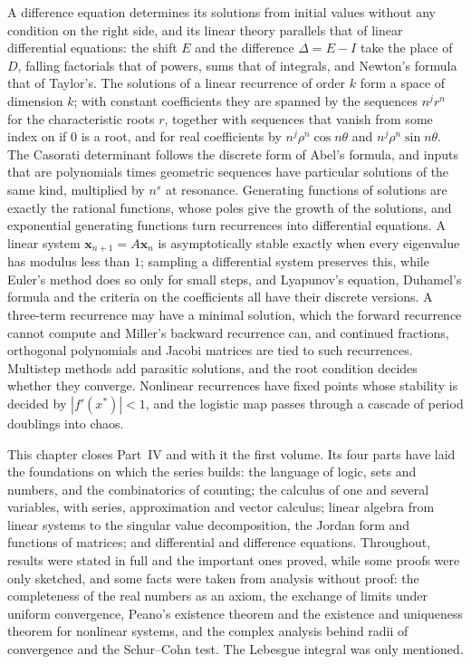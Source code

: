 \bigskip
A difference equation determines its solutions from initial values without any condition on the right side, and its linear theory parallels that of linear differential equations: the shift $E$ and the difference $\Delta=E-I$ take the place of $D$, falling factorials that of powers, sums that of integrals, and Newton's formula that of Taylor's. The solutions of a linear recurrence of order $k$ form a space of dimension $k$; with constant coefficients they are spanned by the sequences $n^jr^n$ for the characteristic roots $r$, together with sequences that vanish from some index on if $0$ is a root, and for real coefficients by $n^j\rho^n\cos n\theta$ and $n^j\rho^n\sin n\theta$. The Casorati determinant follows the discrete form of Abel's formula, and inputs that are polynomials times geometric sequences have particular solutions of the same kind, multiplied by $n^s$ at resonance. Generating functions of solutions are exactly the rational functions, whose poles give the growth of the solutions, and exponential generating functions turn recurrences into differential equations. A linear system $\mathbf x_{n+1}=A\mathbf x_n$ is asymptotically stable exactly when every eigenvalue has modulus less than $1$; sampling a differential system preserves this, while Euler's method does so only for small steps, and Lyapunov's equation, Duhamel's formula and the criteria on the coefficients all have their discrete versions. A three-term recurrence may have a minimal solution, which the forward recurrence cannot compute and Miller's backward recurrence can, and continued fractions, orthogonal polynomials and Jacobi matrices are tied to such recurrences. Multistep methods add parasitic solutions, and the root condition decides whether they converge. Nonlinear recurrences have fixed points whose stability is decided by $|f'(x^*)|<1$, and the logistic map passes through a cascade of period doublings into chaos.

This chapter closes Part~IV and with it the first volume. Its four parts have laid the foundations on which the series builds: the language of logic, sets and numbers, and the combinatorics of counting; the calculus of one and several variables, with series, approximation and vector calculus; linear algebra from linear systems to the singular value decomposition, the Jordan form and functions of matrices; and differential and difference equations. Throughout, results were stated in full and the important ones proved, while some proofs were only sketched, and some facts were taken from analysis without proof: the completeness of the real numbers as an axiom, the exchange of limits under uniform convergence, Peano's existence theorem and the existence and uniqueness theorem for nonlinear systems, and the complex analysis behind radii of convergence and the Schur--Cohn test. The Lebesgue integral was only mentioned.

